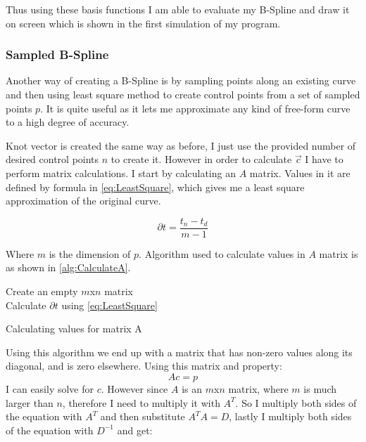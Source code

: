 \documentclass[a4paper,12pt]{extarticle}
\begin{document}
Thus using these basis functions I am able to evaluate my B-Spline and draw it on screen which is shown in the first simulation of my program.

\subsubsection{Sampled B-Spline}
Another way of creating a B-Spline is by sampling points along an existing curve and then using least square method to create control points from a set of sampled points $p$. It is quite useful as it lets me approximate any kind of free-form curve to a high degree of accuracy.

Knot vector is created the same way as before, I just use the provided number of desired control points $n$ to create it. However in order to calculate $\vec{c}$ I have to perform matrix calculations. I start by calculating an $A$ matrix. Values in it are defined by formula in \cref{eq:LeastSquare}, which gives me a least square approximation of the original curve.

\begin{equation}
\partial t = \frac{t_n - t_d}{m-1}
\label{eq:LeastSquare}
\end{equation}

Where $m$ is the dimension of $p$. Algorithm used to calculate values in $A$ matrix is as shown in \cref{alg:CalculateA}.

\begin{algorithm}
  Create an empty $m$x$n$ matrix\\
  Calculate $\partial t$ using \eqref{eq:LeastSquare}\\
  \caption{Calculating values for matrix A}
  \label{alg:CalculateA}
\end{algorithm}

Using this algorithm we end up with a matrix that has non-zero values along its diagonal, and is zero elsewhere. Using this matrix and property: $$Ac = p$$ I can easily solve for $c$. However since $A$ is an $m$x$n$ matrix, where $m$ is much larger than $n$, therefore I need to multiply it with $A^T$. So I multiply both sides of the equation with $A^T$ and then substitute $A^TA=D$, lastly I multiply both sides of the equation with $D^{-1}$ and get:
\end{document}
